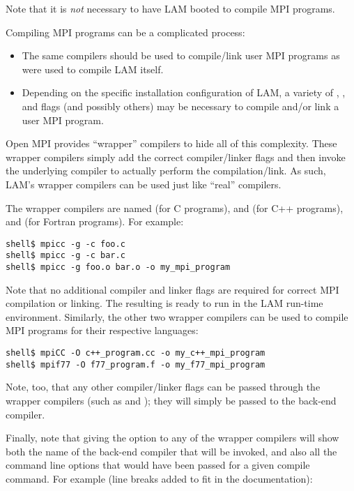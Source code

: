 Note that it is {\em not} necessary to have LAM booted to compile MPI
programs.

Compiling MPI programs can be a complicated process:

\begin{itemize}
\item The same compilers should be used to compile/link user MPI
  programs as were used to compile LAM itself.
  
\item Depending on the specific installation configuration of LAM, a
  variety of , , and  flags (and
  possibly others) may be necessary to compile and/or link a user MPI
  program.
\end{itemize}

Open MPI provides ``wrapper'' compilers to hide all of this complexity.
These wrapper compilers simply add the correct compiler/linker flags
and then invoke the underlying compiler to actually perform the
compilation/link.  As such, LAM's wrapper compilers can be used just
like ``real'' compilers.

The wrapper compilers are named  (for C programs),
 and  (for C++ programs), and 
(for Fortran programs).  For example:

\lstset{style=lam-cmdline}
\begin{lstlisting}
shell$ mpicc -g -c foo.c
shell$ mpicc -g -c bar.c
shell$ mpicc -g foo.o bar.o -o my_mpi_program
\end{lstlisting}

Note that no additional compiler and linker flags are required for
correct MPI compilation or linking.  The resulting
 is ready to run in the LAM run-time
environment.  Similarly, the other two wrapper compilers can be used
to compile MPI programs for their respective languages:

\lstset{style=lam-cmdline}
\begin{lstlisting}
shell$ mpiCC -O c++_program.cc -o my_c++_mpi_program
shell$ mpif77 -O f77_program.f -o my_f77_mpi_program
\end{lstlisting}

Note, too, that any other compiler/linker flags can be passed through
the wrapper compilers (such as  and ); they will
simply be passed to the back-end compiler.

Finally, note that giving the  option to any of the
wrapper compilers will show both the name of the back-end compiler
that will be invoked, and also all the command line options that would
have been passed for a given compile command.  For example (line
breaks added to fit in the documentation):

